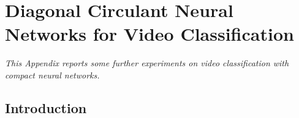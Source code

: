 \chapter{Diagonal Circulant Neural Networks for Video Classification}
\label{appendix:ap2-diagonal_circulant_neural_networks_for_video_classification}

\noindent
\emph{This Appendix reports some further experiments on video classification with compact neural networks.}

\localtoc



\section{Introduction}
\label{section:ap2-introduction}

